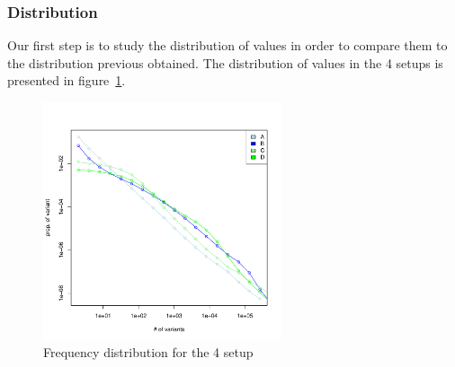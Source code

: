 \documentclass{wscpaperproc}
\begin{document}
\subsubsection{Distribution}


Our first step is to study the distribution of values in order to compare them to the distribution previous obtained. The distribution of values in the 4 setups is presented in figure~\ref{fig:4setDi}. 

\begin{figure}[H]
	\begin{center}
		\includegraphics[width=7cm]{img/frequenciesABCD.pdf}
	\end{center}
	\caption{Frequency distribution for the 4 setup}
	\label{fig:4setDi}
\end{figure}
\end{document}
